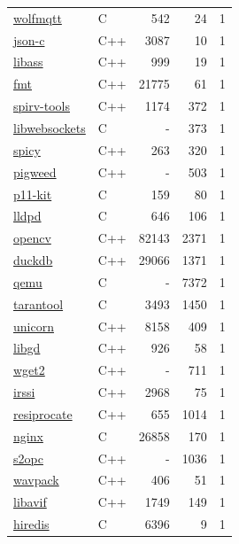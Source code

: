 \begin{table}[p]
\begin{minipage}[t]{.32\textwidth}
{\begin{tabular}[t]{@{}llrrr@{}}
\href{https://www.wolfssl.com/products/wolfmqtt/}{wolfmqtt} & C & 542 & 24 & 1 \\
\href{https://json-c.github.io/json-c/}{json-c} & C++ & 3087 & 10 & 1 \\
\href{https://github.com/libass/libass}{libass} & C++ & 999 & 19 & 1 \\
\href{https://github.com/fmtlib/fmt}{fmt} & C++ & 21775 & 61 & 1 \\
\href{https://github.com/KhronosGroup/SPIRV-Tools}{spirv-tools} & C++ & 1174 & 372 & 1 \\
\href{https://libwebsockets.org}{libwebsockets} & C & - & 373 & 1 \\
\href{https://docs.zeek.org/projects/spicy/en/latest/}{spicy} & C++ & 263 & 320 & 1 \\
\href{https://pigweed.dev/}{pigweed} & C++ & - & 503 & 1 \\
\href{https://p11-glue.github.io/p11-glue/p11-kit.html}{p11-kit} & C & 159 & 80 & 1 \\
\href{https://lldpd.github.io}{lldpd} & C & 646 & 106 & 1 \\
\href{https://opencv.org/}{opencv} & C++ & 82143 & 2371 & 1 \\
\href{https://duckdb.org/}{duckdb} & C++ & 29066 & 1371 & 1 \\
\href{https://www.qemu.org/}{qemu} & C & - & 7372 & 1 \\
\href{https://www.tarantool.io/en/}{tarantool} & C & 3493 & 1450 & 1 \\
\href{https://www.unicorn-engine.org}{unicorn} & C++ & 8158 & 409 & 1 \\
\href{https://libgd.org}{libgd} & C++ & 926 & 58 & 1 \\
\href{https://gitlab.com/gnuwget/wget2}{wget2} & C++ & - & 711 & 1 \\
\href{https://github.com/irssi/irssi}{irssi} & C++ & 2968 & 75 & 1 \\
\href{https://www.resiprocate.org/}{resiprocate} & C++ & 655 & 1014 & 1 \\
\href{http://nginx.org}{nginx} & C & 26858 & 170 & 1 \\
\href{https://s2opc.com/}{s2opc} & C++ & - & 1036 & 1 \\
\href{http://www.wavpack.com}{wavpack} & C++ & 406 & 51 & 1 \\
\href{https://github.com/AOMediaCodec/libavif}{libavif} & C++ & 1749 & 149 & 1 \\
\href{https://github.com/redis/hiredis}{hiredis} & C & 6396 & 9 & 1 \\

\end{tabular}}
\end{minipage}
\end{table}

